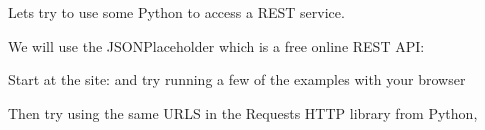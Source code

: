 \documentclass[Screen16to9,17pt]{foils}
\begin{document}

\inputminted{python}{programs/rest-1.py}

\begin{list2}
\item  Lets try to use some Python to access a REST service.
\item  We will use the JSONPlaceholder which is a free online REST API:
\item Start at the site:  and try running a few of the examples with your browser
\item Then try using the same URLS in the Requests HTTP library from Python,\\
\end{list2}



\slidenext
\end{document}

